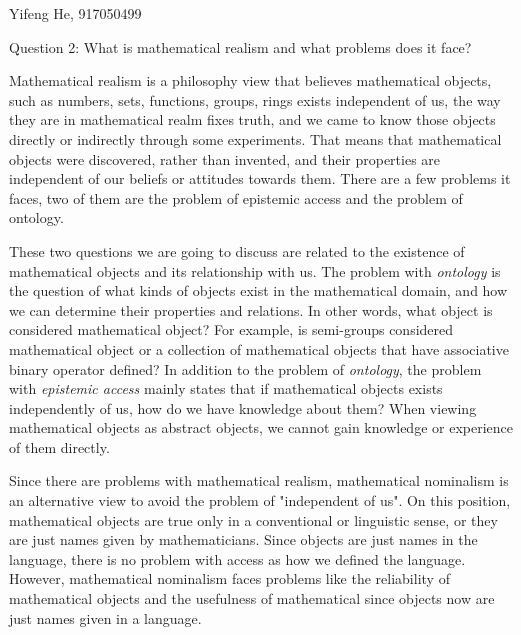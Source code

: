 \documentclass[11pt]{article}
\begin{document}
\begin{center}
    Yifeng He, 917050499
\end{center}

\begin{center}
    Question 2:
    What is mathematical realism and what problems does it face?
\end{center}

Mathematical realism is a philosophy view that 
believes mathematical objects,
such as numbers, sets, functions, groups, rings
exists independent of us,
the way they are in mathematical realm fixes truth,
and we came to know those objects directly or indirectly through some experiments.
That means that mathematical objects were discovered, 
rather than invented, 
and their properties are independent of our beliefs or attitudes towards them.
There are a few problems it faces,
two of them are the problem of epistemic access and the problem of ontology.

These two questions we are going to discuss are related to
the existence of mathematical objects and its relationship with us.
The problem with \textit{ontology} is the question of
what kinds of objects exist in the mathematical domain, and how we can determine their properties and relations.
In other words, what object is considered mathematical object?
For example, is semi-groups considered mathematical object or 
a collection of mathematical objects that have associative binary operator defined?
In addition to the problem of \textit{ontology},
the problem with \textit{epistemic access} mainly states that
if mathematical objects exists independently of us,
how do we have knowledge about them?
When viewing mathematical objects as abstract objects,
we cannot gain knowledge or experience of them directly.

Since there are problems with mathematical realism,
mathematical nominalism is an alternative view to avoid the problem of "independent of us".
On this position, 
mathematical objects are true only in a conventional or linguistic sense,
or they are just names given by mathematicians.
Since objects are just names in the language,
there is no problem with access as how we defined the language.
However, mathematical nominalism faces problems like
the reliability of mathematical objects and the usefulness of mathematical
since objects now are just names given in a language.
\end{document}
